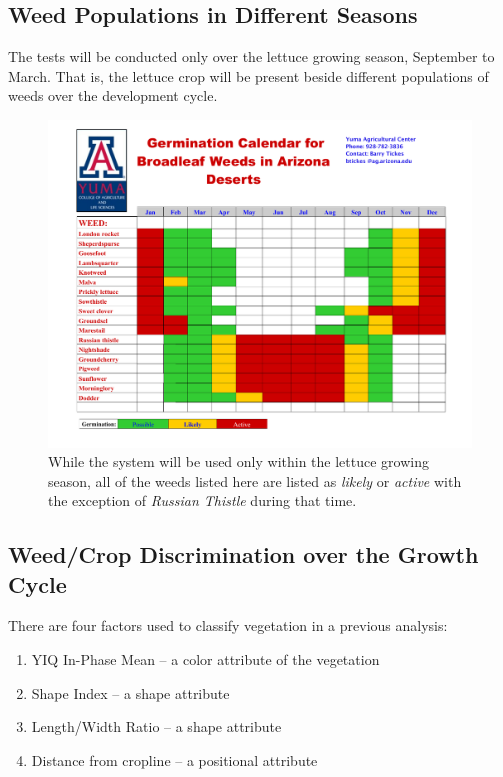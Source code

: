 \documentclass[12pt]{article}
\begin{document}
\subsection{Weed Populations in Different Seasons}
The tests will be conducted only over the lettuce growing season, September to March. That is, the lettuce crop will be present beside different populations of weeds over the development cycle.
\begin{figure}[H]
	\centering
	\includegraphics[width=0.75\linewidth]{./figures/broadleaf-calendar.pdf}
	\caption[Germination schedule for broadleaf weeds]{While the system will be used only within the lettuce growing season, all of the weeds listed here are listed as \textit{likely} or \textit{active} with the exception of \textit{Russian Thistle} during that time.}
	\label{fig:weed-germination}
\end{figure}



\subsection{Weed/Crop Discrimination over the Growth Cycle}
There are four factors used to classify vegetation in a previous analysis:
\begin{enumerate}
	\item{YIQ In-Phase Mean -- a color attribute of the vegetation}
	\item{Shape Index -- a shape attribute}
	\item{Length/Width Ratio -- a shape attribute}
	\item{Distance from cropline -- a positional attribute}
\end{enumerate}
\end{document}
